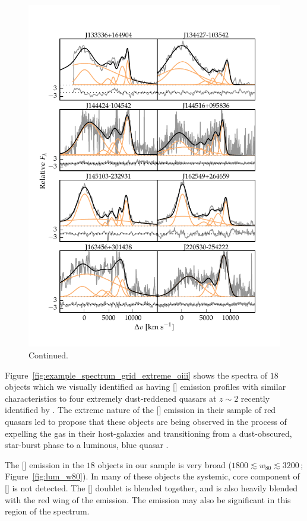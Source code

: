 \begin{figure}[t!]
\ContinuedFloat
    \centering
    \includegraphics[width=\columnwidth]{figures/chapter04/example_spectrum_grid_extreme_oiii_2.pdf} 
    \caption[]{Continued.}     
\end{figure}

Figure~\ref{fig:example_spectrum_grid_extreme_oiii} shows the spectra of $18$ objects which we visually identified as having [] emission profiles with similar characteristics to four extremely dust-reddened quasars at $z\sim2$ recently identified by \citet{zakamska16}. 
The extreme nature of the [] emission in their sample of red quasars led \citet{zakamska16} to propose that these objects are being observed in the process of expelling the gas in their host-galaxies and transitioning from a dust-obscured, star-burst phase to a luminous, blue quasar \citep[e.g.][]{sanders88}.

The [] emission in the $18$ objects in our sample is very broad ($1800 \lesssim w_{80} \lesssim 3200$\,\kms; Figure~\ref{fig:lum_w80}). 
In many of these objects the systemic, core component of [] is not detected.
The [] doublet is blended together, and is also heavily blended with the red wing of the \hb emission. 
The  emission may also be significant in this region of the spectrum. 

